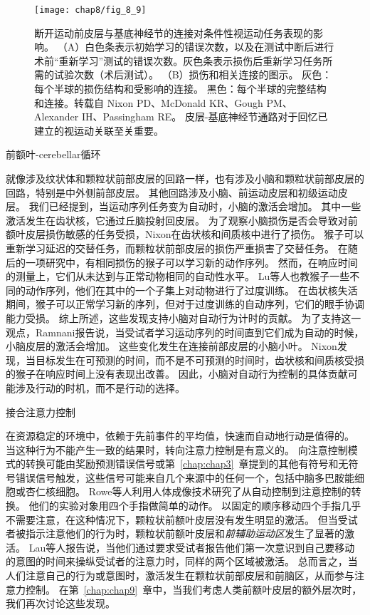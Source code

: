 \begin{figure} 
	\centering
	\texttt{[image: chap8/fig\_8\_9]}
	\caption{断开运动前皮层与基底神经节的连接对条件性视运动任务表现的影响。
		（A）白色条表示初始学习的错误次数，以及在测试中断后进行术前“重新学习”测试的错误次数。灰色条表示损伤后重新学习任务所需的试验次数（术后测试）。
		（B）损伤和相关连接的图示。
		灰色：每个半球的损伤结构和受影响的连接。
		黑色：每个半球的完整结构和连接。转载自 Nixon PD、McDonald KR、Gough PM、Alexander IH、Passingham RE。
		皮层-基底神经节通路对于回忆已建立的视运动关联至关重要\cite{nixon2004cortico}。 \label{fig:8_9}}
\end{figure}



前额叶-cerebellar循环

就像涉及纹状体和颗粒状前部皮层的回路一样，也有涉及小脑和颗粒状前部皮层的回路，特别是中外侧前部皮层\cite{kelly2003cerebellar}。
其他回路涉及小脑、前运动皮层和初级运动皮层\cite{strick2009cerebellum}。
我们已经提到，当运动序列任务变为自动时，小脑的激活会增加\cite{floyer2004changing}。
其中一些激活发生在齿状核，它通过丘脑投射回皮层。
为了观察小脑损伤是否会导致对前额叶皮层损伤敏感的任务受损，Nixon\cite{nixon1999cerebellum}在齿状核和间质核中进行了损伤。
猴子可以重新学习延迟的交替任务，而颗粒状前部皮层的损伤严重损害了交替任务。
在随后的一项研究中，有相同损伤的猴子可以学习新的动作序列。
然而，在响应时间的测量上，它们从未达到与正常动物相同的自动性水平\cite{nixon2000cerebellum}。
Lu等人\cite{lu1998role}也教猴子一些不同的动作序列，他们在其中的一个子集上对动物进行了过度训练。
在齿状核失活期间，猴子可以正常学习新的序列，但对于过度训练的自动序列，它们的眼手协调能力受损。
综上所述，这些发现支持小脑对自动行为计时的贡献。
为了支持这一观点，Ramnani\cite{ramnani2001changes}报告说，当受试者学习运动序列的时间直到它们成为自动的时候，小脑皮层的激活会增加。
这些变化发生在连接前部皮层的小脑小叶。
Nixon\cite{nixon2001predicting}发现，当目标发生在可预测的时间，而不是不可预测的时间时，齿状核和间质核受损的猴子在响应时间上没有表现出改善。
因此，小脑对自动行为控制的具体贡献可能涉及行动的时机，而不是行动的选择。



接合注意力控制

在资源稳定的环境中，依赖于先前事件的平均值，快速而自动地行动是值得的。
当这种行为不能产生一致的结果时，转向注意力控制是有意义的。
向注意控制模式的转换可能由奖励预测错误信号或第~\ref{chap:chap3}~章提到的其他有符号和无符号错误信号触发，这些信号可能来自几个来源中的任何一个，包括中脑多巴胺能细胞或杏仁核细胞。
Rowe等人\cite{rowe2002attention}利用人体成像技术研究了从自动控制到注意控制的转换。
他们的实验对象用四个手指做简单的动作。
以固定的顺序移动四个手指几乎不需要注意，在这种情况下，颗粒状前额叶皮层没有发生明显的激活\cite{rowe2002attention}。
但当受试者被指示注意他们的行为时，颗粒状前额叶皮层和\textit{前辅助运动区}发生了显著的激活。
Lau等人\cite{lau2004attention}报告说，当他们通过要求受试者报告他们第一次意识到自己要移动的意图的时间来操纵受试者的注意力时，同样的两个区域被激活。
总而言之，当人们注意自己的行为或意图时，激活发生在颗粒状前部皮层和前脑区，从而参与注意力控制。
在第~\ref{chap:chap9}~章中，当我们考虑人类前额叶皮层的额外层次时，我们再次讨论这些发现。



